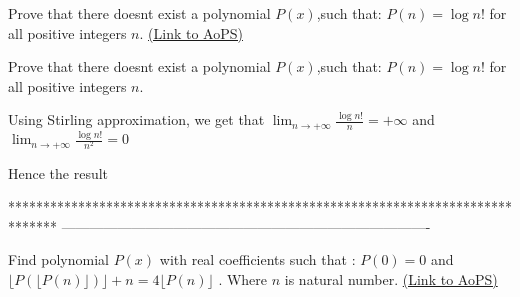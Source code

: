 \begin{problem}
	Prove that there doesnt exist a polynomial $P(x)$,such that:
$P(n)=\log n!$ for all positive integers $n$.
	\flushright \href{https://artofproblemsolving.com/community/c6h566627}{(Link to AoPS)}
\end{problem}



\begin{solution}
	\begin{tcolorbox}Prove that there doesnt exist a polynomial $P(x)$,such that:
$P(n)=\log n!$ for all positive integers $n$.\end{tcolorbox}
Using Stirling approximation, we get that $\lim_{n\to+\infty}\frac{\log n!}{n}=+\infty$ and  $\lim_{n\to+\infty}\frac{\log n!}{n^2}=0$ 

Hence the result
\end{solution}
*******************************************************************************
-------------------------------------------------------------------------------

\begin{problem}
	Find polynomial $P(x)$  with real coefficients such that : $P(0)=0$ and $\lfloor{P(\lfloor{P(n)}\rfloor)}\rfloor+n=4 \lfloor{P(n)}\rfloor $ .
Where $n$ is natural number.
	\flushright \href{https://artofproblemsolving.com/community/c6h567278}{(Link to AoPS)}
\end{problem}



